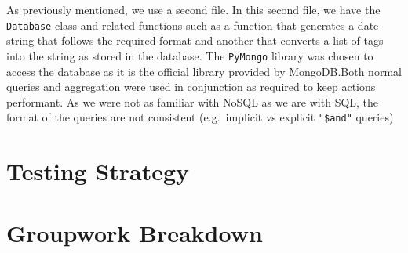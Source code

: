 \documentclass{article}
\begin{document}
As previously mentioned, we use a second file. In this second file, we have the \verb|Database| class and related functions such as a function that generates a date string that follows the required format and another that converts a list of tags into the string as stored in the database. The \verb|PyMongo| library was chosen to access the database as it is the official library provided by MongoDB.\@ Both normal queries and aggregation were used in conjunction as required to keep actions performant. As we were not as familiar with NoSQL as we are with SQL, the format of the queries are not consistent (e.g.\ implicit vs explicit \verb|"$and"| queries)


\section{Testing Strategy}





\section{Groupwork Breakdown}
\end{document}
